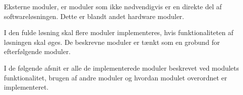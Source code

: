 Eksterne moduler, er moduler som ikke nødvendigvis er en direkte del af softwareløsningen. Dette er blandt andet hardware moduler.

I den fulde løsning skal flere moduler implementeres, hvis funktionaliteten af løsningen skal øges. De beskrevne moduler er tænkt som en grobund for efterfølgende moduler.

I de følgende afsnit er alle de implementerede moduler beskrevet ved modulets funktionalitet, brugen af andre moduler og hvordan modulet overordnet er implementeret.








\clearpage

